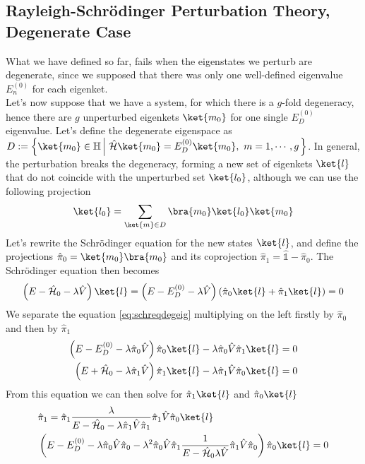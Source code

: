 \documentclass[a4paper, 11pt]{book}
\newcommand{\1}{\opr{\mathds{1}}}
\newcommand{\ham}{\mathcal{H}}
\newcommand{\opr}[1]{\hat{#1}}
\newcommand{\hilbert}{\mathbb{H}}
\theoremstyle{plain}
\begin{document}
	\subsection{Rayleigh-Schrödinger Perturbation Theory, Degenerate Case}
	What we have defined so far, fails when the eigenstates we perturb are degenerate, since we supposed that there was only one well-defined eigenvalue $E_n^{(0)}$ for each eigenket.\\
	Let's now suppose that we have a system, for which there is a $g$-fold degeneracy, hence there are $g$ unperturbed eigenkets $\ket{m_0}$ for one single $E_D^{(0)}$ eigenvalue. Let's define the degenerate eigenspace as $D:=\left\{\ket{m_0}\in\hilbert\left|\ \opr{\ham}\ket{m_0}=E_D^{(0)}\ket{m_0},\ m=1,\cdots,g\right.\right\}$. In general, the perturbation breaks the degeneracy, forming a new set of eigenkets $\ket{l}$ that do not coincide with the unperturbed set $\ket{l_0}$, although we can use the following projection
	\begin{equation*}
		\ket{l_0}=\sum_{\ket{m}\in D}\bra{m_0}\ket{l_0}\ket{m_0}
	\end{equation*}
	Let's rewrite the Schrödinger equation for the new states $\ket{l}$, and define the projections $\opr{\pi}_0=\ket{m_0}\bra{m_0}$ and its coprojection $\opr{\pi}_1=\1-\opr{\pi}_0$. The Schrödinger equation then becomes
	\begin{equation}
		\left( E-\opr{\ham}_0-\lambda\opr{V} \right)\ket{l}=\left( E-E_D^{(0)}-\lambda\opr{V} \right)\left( \opr{\pi}_0\ket{l}+\opr{\pi}_1\ket{l} \right)=0
		\label{eq:schreqdegeig}
	\end{equation}
	We separate the equation \eqref{eq:schreqdegeig} multiplying on the left firstly by $\opr{\pi}_0$ and then by $\opr{\pi}_1$
	\begin{equation}
		\begin{aligned}
			\left( E-E_D^{(0)}-\lambda\opr{\pi}_0\opr{V} \right)\opr{\pi}_0\ket{l}-\lambda\opr{\pi}_0\opr{V}\opr{\pi}_1\ket{l}&=0\\
			\left( E+\opr{\ham}_0-\lambda\opr{\pi}_1\opr{V} \right)\opr{\pi}_1\ket{l}-\lambda\opr{\pi}_1\opr{V}\opr{\pi}_0\ket{l}&=0
		\end{aligned}
		\label{eq:newschreqdegeig}
	\end{equation}
	From this equation we can then solve for $\opr{\pi}_1\ket{l}$ and $\opr{\pi}_0\ket{l}$
	\begin{equation}
		\begin{aligned}
			&\opr{\pi}_1=\opr{\pi}_1\frac{\lambda}{E-\opr{\ham}_0-\lambda\opr{\pi}_1\opr{V}\opr{\pi}_1}\opr{\pi}_1\opr{V}\opr{\pi}_0\ket{l}\\
			&\left( E-E_D^{(0)}-\lambda\opr{\pi}_0\opr{V}\opr{\pi}_0-\lambda^2\opr{\pi}_0\opr{V}\opr{\pi}_1\frac{1}{E-\opr{\ham}_0\lambda\opr{V}}\opr{\pi}_1\opr{V}\opr{\pi}_0 \right)\opr{\pi}_0\ket{l}=0
		\end{aligned}
		\label{eq:projsoldegschr}
	\end{equation}
\end{document}
